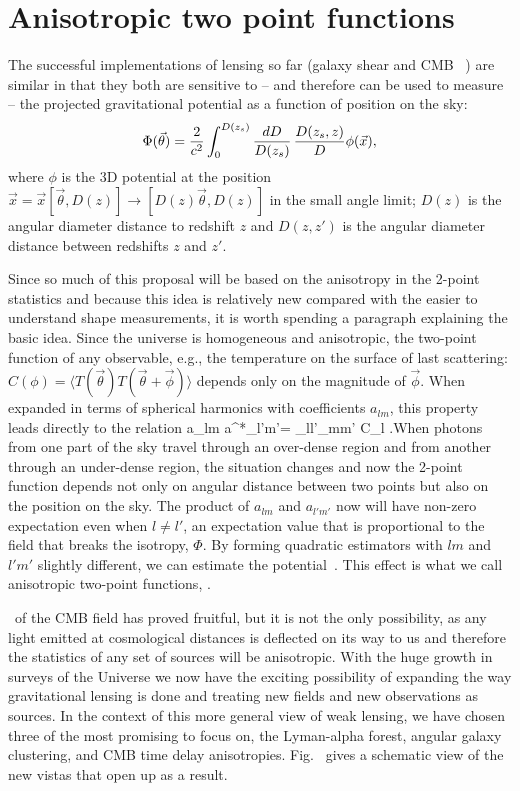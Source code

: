 \section{Anisotropic two point functions}

The successful implementations of lensing so far (galaxy shear
and CMB \atf\ ) are similar in that 
they both are sensitive to -- and therefore 
can be used to measure -- the projected gravitational potential as a function 
of position on the sky:
\begin{equation}
\Phi(\vec\theta)=\frac{2}{c^2}\int^{D(z_{s})}_{0}\frac{dD}{D(z_s)}\,\frac{D(z_{s},z)}{D}\phi(\vec
x),\eql{phi}
\end{equation}
where $\phi$ is the 3D potential at the position $\vec x=\vec
x[\vec\theta,D(z)]\rightarrow [D(z)\vec\theta,D(z)]$ in the small
angle limit; $D(z)$ is the angular diameter distance to redshift $z$
and $D(z,z')$ is the angular diameter distance between redshifts $z$
and $z'$.

 Since so much of this proposal will be based on
the anisotropy in the 2-point statistics and because this idea is
relatively new \citep{Hu:2001tn} compared with the easier to
understand shape measurements, it is worth spending a paragraph
explaining the basic idea. Since the universe is homogeneous and
anisotropic, the two-point function of any observable, e.g., the
temperature on the surface of last scattering: $C(\phi)=\langle T(\vec
\theta)T(\vec\theta+\vec{\phi})\rangle$ depends only on the magnitude
of $\vec\phi$. When expanded in terms of spherical harmonics with
coefficients $a_{lm}$, this property leads directly to the relation
\be \langle a_{lm} a^*_{l'm'}\rangle = \delta_{ll'}\delta_{mm'} C_l
.\ee When photons from one part of the sky travel through an
over-dense region and from another through an under-dense region, the
situation changes and now the 2-point function depends not only on
angular distance between two points but also on the position on the
sky. The product of $a_{lm}$ and $a_{l'm'}$ now will have non-zero
expectation even when $l\ne l'$, an expectation value that is
proportional to the field that breaks the isotropy, $\Phi$. By forming
quadratic estimators with $lm$ and $l'm'$ slightly different, we can
estimate the potential~\citep{Hu:2001tn,okamoto}.  This effect 
is what we call anisotropic two-point
 functions, \atf.
 
\atf\ of the CMB field has proved fruitful, but it is not the only
possibility, as any light emitted at cosmological distances is
deflected on its way to us and therefore the statistics of any set of
sources will be anisotropic. With the huge growth in surveys of the
Universe we now have the exciting possibility of expanding the way
gravitational lensing is done and treating new fields and new
observations as sources. In the context of this more general view of
weak lensing, we have chosen three of the most promising  to
focus on, the Lyman-alpha forest, angular galaxy
clustering, and CMB time delay anisotropies. Fig.~ gives a 
schematic view of the new vistas that open up as a result.

